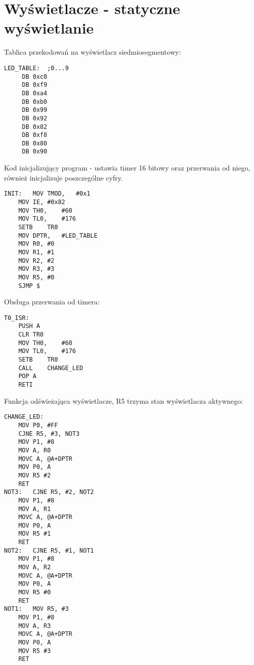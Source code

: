 \documentclass[a4paper, 12pt, titlepage]{article}
\begin{document}
	\section{Wyświetlacze - statyczne wyświetlanie}
	Tablica przekodowań na wyświetlacz siedmiosegmentowy:
\begin{lstlisting}
LED_TABLE:	;0...9
     DB 0xc0 
     DB 0xf9
     DB 0xa4
     DB 0xb0
     DB 0x99
     DB 0x92      
     DB 0x82
     DB 0xf8      
     DB 0x80      
     DB 0x90
\end{lstlisting}
	Kod inicjalizujący program - ustawia timer 16 bitowy oraz przerwania od niego, również inicjalizuje poszczególne cyfry.
\begin{lstlisting}
INIT:	MOV	TMOD,	#0x1
	MOV	IE,	#0x82
	MOV	TH0,	#60
	MOV	TL0,	#176
	SETB	TR0
	MOV	DPTR,	#LED_TABLE
	MOV	R0,	#0
	MOV	R1,	#1
	MOV	R2,	#2
	MOV	R3,	#3
	MOV R5, #0
	SJMP $
\end{lstlisting}
	Obsługa przerwania od timera:
\begin{lstlisting}
T0_ISR:    
	PUSH A
	CLR	TR0
	MOV	TH0,    #60
	MOV	TL0,    #176
	SETB	TR0
	CALL	CHANGE_LED
	POP A
	RETI
\end{lstlisting}
\newpage\noindent
Funkcja odświeżająca wyświetlacze, R5 trzyma stan wyświetlacza aktywnego:
\begin{lstlisting}
CHANGE_LED:
	MOV P0, #FF 
	CJNE R5, #3, NOT3
	MOV P1, #8
	MOV A, R0
	MOVC A, @A+DPTR
	MOV	P0, A
	MOV R5 #2
	RET
NOT3:	CJNE R5, #2, NOT2
	MOV P1, #8
	MOV A, R1
	MOVC A, @A+DPTR
	MOV	P0, A
	MOV R5 #1
	RET
NOT2:	CJNE R5, #1, NOT1
	MOV P1, #8
	MOV A, R2
	MOVC A, @A+DPTR
	MOV	P0, A
	MOV R5 #0
	RET
NOT1:	MOV R5, #3
	MOV P1, #8
	MOV A, R3
	MOVC A, @A+DPTR
	MOV	P0, A
	MOV R5 #3
	RET
\end{lstlisting}
\newpage\noindent
\end{document}
